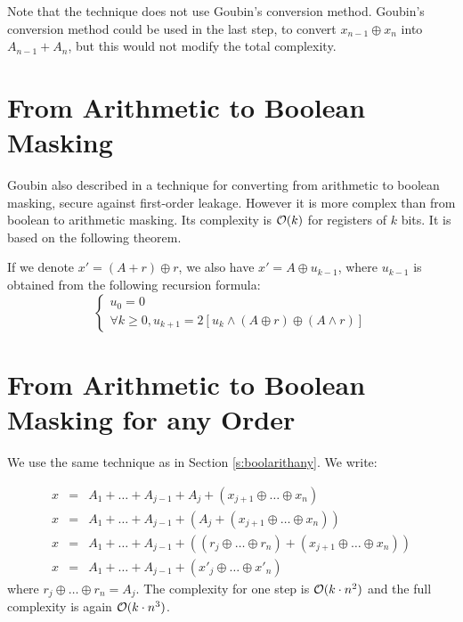 \documentclass[11pt]{llncs}
\begin{document}
Note that the technique does not use Goubin's conversion
method. Goubin's conversion method could be used in the last step, to
convert $x_{n-1} \oplus x_n$ into $A_{n-1}+ A_n$, but this would not
modify the total complexity. 

\section{From Arithmetic to Boolean Masking}

Goubin also described in \cite{goubin} a technique for converting from
arithmetic to boolean masking, secure against first-order leakage. However it
is more complex than from boolean to arithmetic masking. Its
complexity is ${\cal O}(k)$ for registers of $k$ bits.
It is based on the following theorem.

\begin{theorem}
\label{t:goubin2}
If we denote $x'=(A+r) \oplus r$, we also have $x'=A \oplus u_{k-1}$,
where $u_{k-1}$ is obtained from the following recursion formula:
$$\left\{
\begin{array}{l}
u_0=0 \\
\forall k \geq 0, u_{k+1}=2 [u_k \wedge (A \oplus r) \oplus (A \wedge
  r) ]
\end{array}
\right.
$$
\end{theorem}


\section{From Arithmetic to Boolean Masking for any Order}

\label{s:arithboolany}

We use the same technique as in Section \ref{s:boolarithany}. We write:

\begin{eqnarray*}
x & = & A_1 + \ldots +A_{j-1}+ A_j + (x_{j+1} \oplus \ldots \oplus x_n)\\
x & = & A_1 + \ldots +A_{j-1} + \left( A_j + (x_{j+1} \oplus \ldots
\oplus x_n) \right) \\
x & = & A_1 + \ldots +A_{j-1} + \left( (r_{j} \oplus \ldots \oplus
r_n) + (x_{j+1} \oplus \ldots
\oplus x_n) \right) \\
x & = & A_1 + \ldots + A_{j-1} +  \left( x'_{j} \oplus \ldots \oplus
x'_n \right)
\end{eqnarray*}
where $r_{j} \oplus \ldots \oplus r_n=A_j$. The complexity for one
step is ${\cal O}(k \cdot n^2)$ and the full complexity is again
${\cal O}(k \cdot n^3)$. 
\end{document}
